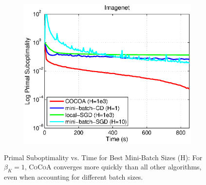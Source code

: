 \documentclass{article} %
\newcommand{\algname}{\textsc{CoCoA}\xspace}  %
\begin{document}
\begin{figure}[H]
\begin{subfigure}{.33\textwidth}
\includegraphics[width=\linewidth]{figs/New_Imagenet_Best_Batches_Annotated.eps}
\end{subfigure}\vspace{-1mm}
\caption{\small Primal Suboptimality vs. Time for Best Mini-Batch Sizes (H): 
For $\beta_K=1$, \algname converges more quickly than all other algorithms, 
even when accounting for different batch sizes.}
\label{fig:BatchTime}
\end{figure}
\vspace{-1em}
\end{document}
